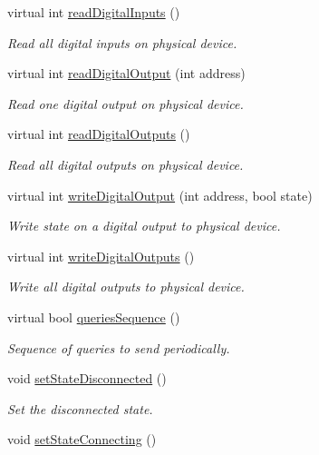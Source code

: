 \begin{DoxyCompactItemize}
virtual int \hyperlink{classmdt_device_a4f4d18f217aa1cf483027c9b3c0ad09b}{readDigitalInputs} ()
\begin{DoxyCompactList}\small\item\em Read all digital inputs on physical device. \end{DoxyCompactList}\item 
virtual int \hyperlink{classmdt_device_a9d3f57d6022d2554f6f6a9f59a4984c1}{readDigitalOutput} (int address)
\begin{DoxyCompactList}\small\item\em Read one digital output on physical device. \end{DoxyCompactList}\item 
virtual int \hyperlink{classmdt_device_a7cc2f2429776f26f45d42cf49a610958}{readDigitalOutputs} ()
\begin{DoxyCompactList}\small\item\em Read all digital outputs on physical device. \end{DoxyCompactList}\item 
virtual int \hyperlink{classmdt_device_a2a1354e80bd6f3bdca3b68cc0a9a4ea1}{writeDigitalOutput} (int address, bool state)
\begin{DoxyCompactList}\small\item\em Write state on a digital output to physical device. \end{DoxyCompactList}\item 
virtual int \hyperlink{classmdt_device_ad640c81dd966ed31c46d14961fd12830}{writeDigitalOutputs} ()
\begin{DoxyCompactList}\small\item\em Write all digital outputs to physical device. \end{DoxyCompactList}\item 
virtual bool \hyperlink{classmdt_device_acba50968d201ad95c4eaa2ab2ed48b4f}{queriesSequence} ()
\begin{DoxyCompactList}\small\item\em Sequence of queries to send periodically. \end{DoxyCompactList}\item 
void \hyperlink{classmdt_device_ac3df06706c79730fde70ee6131af577c}{setStateDisconnected} ()
\begin{DoxyCompactList}\small\item\em Set the disconnected state. \end{DoxyCompactList}\item 
void \hyperlink{classmdt_device_afe240d2bb42c13182ea3b1b5deff006b}{setStateConnecting} ()

\end{DoxyCompactItemize}
